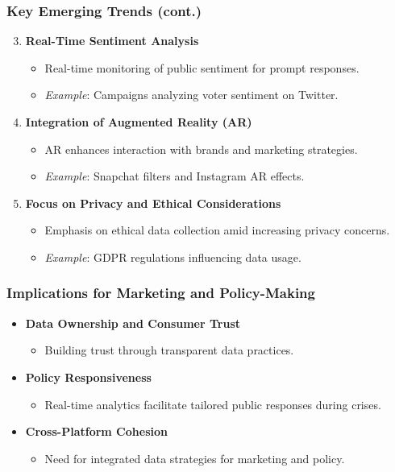 \documentclass{beamer}
\begin{document}
\begin{frame}[fragile]
    \frametitle{Key Emerging Trends (cont.)}
    \begin{enumerate}
        \setcounter{enumi}{2}
        \item \textbf{Real-Time Sentiment Analysis}
        \begin{itemize}
            \item Real-time monitoring of public sentiment for prompt responses.
            \item \textit{Example}: Campaigns analyzing voter sentiment on Twitter.
        \end{itemize}

        \item \textbf{Integration of Augmented Reality (AR)}
        \begin{itemize}
            \item AR enhances interaction with brands and marketing strategies.
            \item \textit{Example}: Snapchat filters and Instagram AR effects.
        \end{itemize}

        \item \textbf{Focus on Privacy and Ethical Considerations}
        \begin{itemize}
            \item Emphasis on ethical data collection amid increasing privacy concerns.
            \item \textit{Example}: GDPR regulations influencing data usage.
        \end{itemize}
    \end{enumerate}
\end{frame}

\begin{frame}[fragile]
    \frametitle{Implications for Marketing and Policy-Making}
    \begin{itemize}
        \item \textbf{Data Ownership and Consumer Trust}
            \begin{itemize}
                \item Building trust through transparent data practices.
            \end{itemize}
        \item \textbf{Policy Responsiveness}
            \begin{itemize}
                \item Real-time analytics facilitate tailored public responses during crises.
            \end{itemize}
        \item \textbf{Cross-Platform Cohesion}
            \begin{itemize}
                \item Need for integrated data strategies for marketing and policy.
            \end{itemize}
    \end{itemize}
\end{frame}
\end{document}
